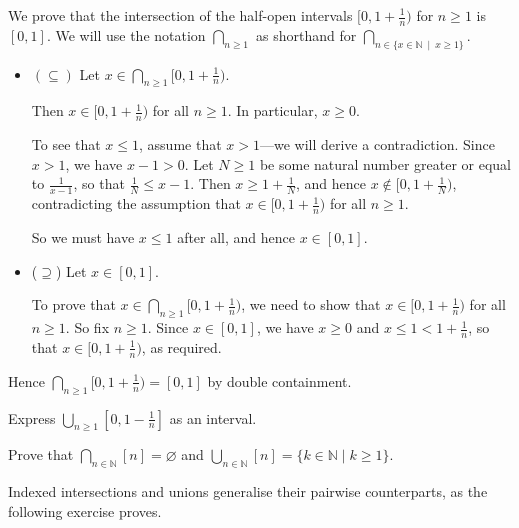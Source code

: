 \begin{example}
\label{exIndexedIntersectionOfHalfOpenIntervals}
We prove that the intersection of the half-open intervals $[0,1+\frac{1}{n})$ for $n \ge 1$ is $[0,1]$. We will use the notation $\displaystyle \bigcap_{n \ge 1}$ as shorthand for $\displaystyle \bigcap_{n \in \{ x \in \mathbb{N} ~\mid~ x \ge 1 \}}$.

\begin{itemize}
\item $(\subseteq)$ Let $x \in \displaystyle\bigcap_{n \ge 1} [0,1+\frac{1}{n})$.

Then $x \in [0,1+\frac{1}{n})$ for all $n \ge 1$. In particular, $x \ge 0$.

To see that $x \le 1$, assume that $x>1$---we will derive a contradiction. Since $x>1$, we have $x-1 > 0$. Let $N \ge 1$ be some natural number greater or equal to $\frac{1}{x-1}$, so that $\frac{1}{N} \le x-1$. Then $x \ge 1 + \frac{1}{N}$, and hence $x \not\in [0,1+\frac{1}{N})$, contradicting the assumption that $x \in [0,1+\frac{1}{n})$ for all $n \ge 1$.

So we must have $x \le 1$ after all, and hence $x \in [0,1]$.

\item ($\supseteq$) Let $x \in [0,1]$.

To prove that $x \in \displaystyle \bigcap_{n \ge 1} [0,1+\frac{1}{n})$, we need to show that $x \in [0,1+\frac{1}{n})$ for all $n \ge 1$. So fix $n \ge 1$. Since $x \in [0,1]$, we have $x \ge 0$ and $x \le 1 < 1+\frac{1}{n}$, so that $x \in [0,1+\frac{1}{n})$, as required.
\end{itemize}

Hence $\displaystyle\bigcap_{n \ge 1} [0,1+\frac{1}{n}) = [0,1]$ by double containment.
\end{example}

\begin{exercise}
Express $\displaystyle\bigcup_{n \ge 1} [0,1-\frac{1}{n}]$ as an interval.
\end{exercise}

\begin{exercise}
Prove that $\displaystyle\bigcap_{n \in \mathbb{N}} [n] = \varnothing$ and $\displaystyle\bigcup_{n \in \mathbb{N}} [n] = \{ k \in \mathbb{N} \mid k \ge 1 \}$.
\end{exercise}

Indexed intersections and unions generalise their pairwise counterparts, as the following exercise proves.

